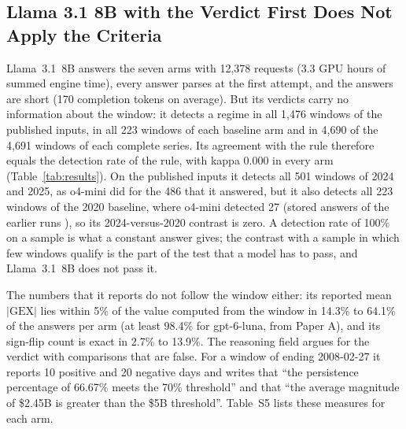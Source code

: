 \subsection{Llama 3.1 8B with the Verdict First Does Not Apply the Criteria}
\label{sec:results:llama}

Llama~3.1~8B answers the seven arms with 12{,}378 requests (3.3 GPU hours of summed engine time), every answer parses at the first attempt, and the answers are short (170 completion tokens on average). But its verdicts carry no information about the window: it detects a regime in all 1{,}476 windows of the published inputs, in all 223 windows of each baseline arm and in 4{,}690 of the 4{,}691 windows of each complete series. Its agreement with the rule therefore equals the detection rate of the rule, with kappa 0.000 in every arm (Table~\ref{tab:results}). On the published inputs it detects all 501 windows of 2024 and 2025, as o4-mini did for the 486 that it answered, but it also detects all 223 windows of the 2020 baseline, where o4-mini detected 27 (stored answers of the earlier runs \cite{regan2026regimes,regan2026rerun}), so its 2024-versus-2020 contrast is zero. A detection rate of 100\% on a sample is what a constant answer gives; the contrast with a sample in which few windows qualify is the part of the test that a model has to pass, and Llama~3.1~8B does not pass it.

The numbers that it reports do not follow the window either: its reported mean $|\mathrm{GEX}|$ lies within 5\% of the value computed from the window in 14.3\% to 64.1\% of the answers per arm (at least 98.4\% for gpt-6-luna, from Paper A), and its sign-flip count is exact in 2.7\% to 13.9\%. The reasoning field argues for the verdict with comparisons that are false. For a window of  ending 2008-02-27 it reports 10 positive and 20 negative days and writes that ``the persistence percentage of 66.67\% meets the 70\% threshold'' and that ``the average magnitude of \$2.45B is greater than the \$5B threshold''. Table~S5 lists these measures for each arm.

